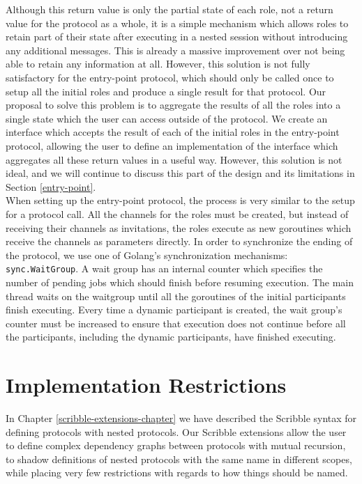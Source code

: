 \documentclass[12pt,twoside]{report}
\begin{document}
Although this return value is only the partial state of each role, not a return value for the protocol as a whole, it is a simple mechanism which allows roles to retain part of their state after executing in a nested session without introducing any additional messages. This is already a massive improvement over not being able to retain any information at all. However, this solution is not fully satisfactory for the entry-point protocol, which should only be called once to setup all the initial roles and produce a single result for that protocol. Our proposal to solve this problem is to aggregate the results of all the roles into a single state which the user can access outside of the protocol. We create an interface which accepts the result of each of the initial roles in the entry-point protocol, allowing the user to define an implementation of the interface which aggregates all these return values in a useful way. However, this solution is not ideal, and we will continue to discuss this part of the design and its limitations in Section \ref{entry-point}.\\

When setting up the entry-point protocol, the process is very similar to the setup for a protocol call. All the channels for the roles must be created, but instead of receiving their channels as invitations, the roles execute as new goroutines which receive the channels as parameters directly. In order to synchronize the ending of the protocol, we use one of Golang's synchronization mechanisms: \texttt{sync.WaitGroup}. A wait group has an internal counter which specifies the number of pending jobs which should finish before resuming execution. The main thread waits on the waitgroup until all the goroutines of the initial participants finish executing. Every time a dynamic participant is created, the wait group's counter must be increased to ensure that execution does not continue before all the participants, including the dynamic participants, have finished executing.

\section{Implementation Restrictions}\label{implementation-restrictions}
In Chapter \ref{scribble-extensions-chapter} we have described the Scribble syntax for defining protocols with nested protocols. Our Scribble extensions allow the user to define complex dependency graphs between protocols with mutual recursion, to shadow definitions of nested protocols with the same name in different scopes, while placing very few restrictions with regards to how things should be named.\\
\end{document}

